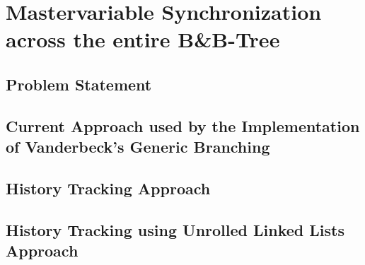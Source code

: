 \section{Mastervariable Synchronization across the entire B\&B-Tree}\label{sec:gm_sync}
\subsection{Problem Statement}\label{subsec:gm_sync_problem}
\subsection{Current Approach used by the Implementation of Vanderbeck's Generic Branching}\label{subsec:gm_sync_current}
\subsection{History Tracking Approach}\label{subsec:gm_sync_history}
\subsection{History Tracking  using Unrolled Linked Lists Approach}\label{subsec:gm_sync_history_unrolled}